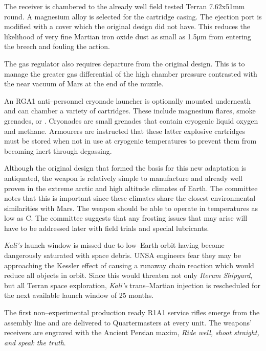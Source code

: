 The receiver is chambered to the already well field tested Terran 7.62x51mm round. A magnesium alloy is selected for the cartridge casing. The ejection port is modified with a cover which the original design did not have. This reduces the likelihood of very fine Martian iron oxide dust as small as 1.5μm from entering the breech and fouling the action.

The gas regulator also requires departure from the original design. This is to manage the greater gas differential of the high chamber pressure contrasted with the near vacuum of Mars at the end of the muzzle.

An RGA1 anti--personnel cryonade launcher is optionally mounted underneath and can chamber a variety of cartridges. These include magnesium flares, smoke grenades, or . Cryonades are small grenades that contain cryogenic liquid oxygen and methane. Armourers are instructed that these latter explosive cartridges must be stored when not in use at cryogenic temperatures to prevent them from becoming inert through degassing.

Although the original design that formed the basis for this new adaptation is antiquated, the weapon is relatively simple to manufacture and already well proven in the extreme arctic and high altitude climates of Earth. The committee notes that this is important since these climates share the closest environmental similarities with Mars. The weapon should be able to operate in temperatures as low as C. The committee suggests that any frosting issues that may arise will have to be addressed later with field trials and special lubricants.
\StopTimelineDate

{\it Kali's} launch window is missed due to low--Earth orbit having become dangerously saturated with space debris. UNSA engineers fear they may be approaching the Kessler effect of causing a runaway chain reaction which would reduce all objects in orbit. Since this would threaten not only {\it Iterum Shipyard}, but all Terran space exploration, {\it Kali's} trans--Martian injection is rescheduled for the next available launch window of 25 months.
\StopTimelineDate

The first non--experimental production ready R1A1 service rifles emerge from the assembly line and are delivered to Quartermasters at every unit. The weapons' receivers are engraved with the Ancient Persian maxim, {\it Ride well, shoot straight, and speak the truth}.

